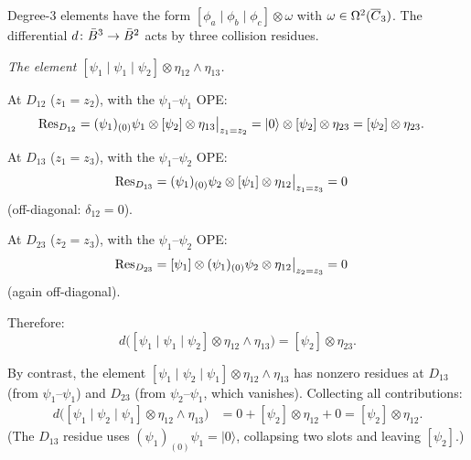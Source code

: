 \begin{computation}
\label{comp:fermion-deg3}
Degree-3 elements have the form
$[\phi_a \mid \phi_b \mid \phi_c] \otimes \omega$
with $\omega \in \Omega^2(\overline{C}_3)$.
The differential $d\colon \bar{B}^3 \to \bar{B}^2$ acts by three collision residues.

\emph{The element $[\psi_1 \mid \psi_1 \mid \psi_2]
\otimes \eta_{12} \wedge \eta_{13}$.}

At $D_{12}$ ($z_1 = z_2$), with the $\psi_1$--$\psi_1$ OPE:
\begin{align*}
\operatorname{Res}_{D_{12}} &= (\psi_1)_{(0)}\psi_1 \otimes [\psi_2]
\otimes \eta_{13}\big|_{z_1 = z_2}
= |0\rangle \otimes [\psi_2] \otimes \eta_{23}
= [\psi_2] \otimes \eta_{23}.
\end{align*}

At $D_{13}$ ($z_1 = z_3$), with the $\psi_1$--$\psi_2$ OPE:
\begin{align*}
\operatorname{Res}_{D_{13}} &= (\psi_1)_{(0)}\psi_2 \otimes [\psi_1]
\otimes \eta_{12}\big|_{z_1 = z_3}
= 0
\end{align*}
(off-diagonal: $\delta_{12} = 0$).

At $D_{23}$ ($z_2 = z_3$), with the $\psi_1$--$\psi_2$ OPE:
\begin{align*}
\operatorname{Res}_{D_{23}} &= [\psi_1] \otimes (\psi_1)_{(0)}\psi_2
\otimes \eta_{12}\big|_{z_2 = z_3}
= 0
\end{align*}
(again off-diagonal).

Therefore:
\begin{equation}\label{eq:fermion-deg3-ex}
d\bigl([\psi_1 \mid \psi_1 \mid \psi_2]
\otimes \eta_{12} \wedge \eta_{13}\bigr)
= [\psi_2] \otimes \eta_{23}.
\end{equation}

By contrast, the element $[\psi_1 \mid \psi_2 \mid \psi_1]
\otimes \eta_{12} \wedge \eta_{13}$ has nonzero residues at
$D_{13}$ (from $\psi_1$--$\psi_1$) and $D_{23}$ (from $\psi_2$--$\psi_1$,
which vanishes).  Collecting all contributions:
\begin{align*}
d\bigl([\psi_1 \mid \psi_2 \mid \psi_1]
\otimes \eta_{12} \wedge \eta_{13}\bigr)
&= 0 + [\psi_2] \otimes \eta_{12} + 0
= [\psi_2] \otimes \eta_{12}.
\end{align*}
(The $D_{13}$ residue uses $(\psi_1)_{(0)}\psi_1 = |0\rangle$,
collapsing two slots and leaving $[\psi_2]$.)
\end{computation}

